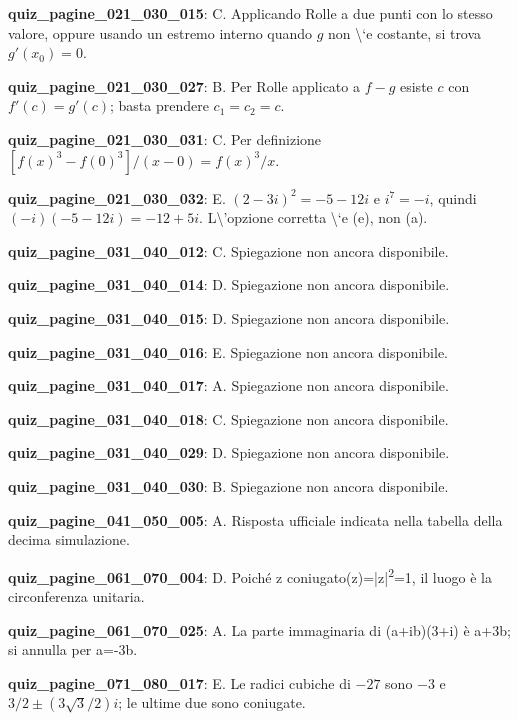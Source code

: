 \documentclass[11pt,a4paper]{article}
\newcounter{quiz}
\begin{document}
\noindent\textbf{quiz\_pagine\_021\_030\_015}: C. Applicando Rolle a due punti con lo stesso valore, oppure usando un estremo interno quando $g$ non \textbackslash{}`e costante, si trova $g\prime(x_0)=0$.\par\medskip
\noindent\textbf{quiz\_pagine\_021\_030\_027}: B. Per Rolle applicato a $f-g$ esiste $c$ con $f\prime(c)=g\prime(c)$; basta prendere $c_1=c_2=c$.\par\medskip
\noindent\textbf{quiz\_pagine\_021\_030\_031}: C. Per definizione $[f(x)^3-f(0)^3]/(x-0)=f(x)^3/x$.\par\medskip
\noindent\textbf{quiz\_pagine\_021\_030\_032}: E. $(2-3i)^2=-5-12i$ e $i^7=-i$, quindi $(-i)(-5-12i)=-12+5i$. L\textbackslash{}'opzione corretta \textbackslash{}`e (e), non (a).\par\medskip
\noindent\textbf{quiz\_pagine\_031\_040\_012}: C. Spiegazione non ancora disponibile.\par\medskip
\noindent\textbf{quiz\_pagine\_031\_040\_014}: D. Spiegazione non ancora disponibile.\par\medskip
\noindent\textbf{quiz\_pagine\_031\_040\_015}: D. Spiegazione non ancora disponibile.\par\medskip
\noindent\textbf{quiz\_pagine\_031\_040\_016}: E. Spiegazione non ancora disponibile.\par\medskip
\noindent\textbf{quiz\_pagine\_031\_040\_017}: A. Spiegazione non ancora disponibile.\par\medskip
\noindent\textbf{quiz\_pagine\_031\_040\_018}: C. Spiegazione non ancora disponibile.\par\medskip
\noindent\textbf{quiz\_pagine\_031\_040\_029}: D. Spiegazione non ancora disponibile.\par\medskip
\noindent\textbf{quiz\_pagine\_031\_040\_030}: B. Spiegazione non ancora disponibile.\par\medskip
\noindent\textbf{quiz\_pagine\_041\_050\_005}: A. Risposta ufficiale indicata nella tabella della decima simulazione.\par\medskip
\noindent\textbf{quiz\_pagine\_061\_070\_004}: D. Poiché z coniugato(z)=|z|\textsuperscript{2}=1, il luogo è la circonferenza unitaria.\par\medskip
\noindent\textbf{quiz\_pagine\_061\_070\_025}: A. La parte immaginaria di (a+ib)(3+i) è a+3b; si annulla per a=-3b.\par\medskip
\noindent\textbf{quiz\_pagine\_071\_080\_017}: E. Le radici cubiche di $-27$ sono $-3$ e $3/2\pm(3\sqrt3/2)i$; le ultime due sono coniugate.\par\medskip
\end{document}
